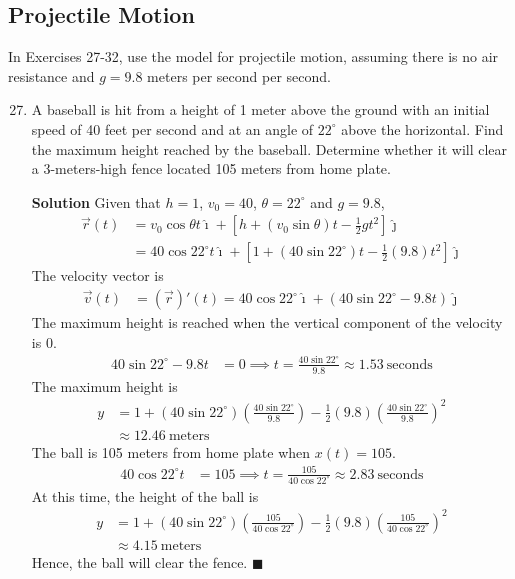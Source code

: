 \documentclass{report}
\begin{document}
\subsection*{Projectile Motion}
In Exercises 27-32, use the model for projectile motion, assuming there is no
air resistance and $g=9.8$ meters per second per second.
\begin{enumerate}
    \setcounter{enumi}{26}
    \item  A baseball is hit from a height of 1 meter above the ground with an initial
          speed of 40 feet per second and at an angle of $22^{\circ}$ above the
          horizontal. Find the maximum height reached by the baseball. Determine whether
          it will clear a 3-meters-high fence located 105 meters from home plate.

          \textbf{Solution} Given that $h = 1$, $v_0 = 40$, $\theta = 22^{\circ}$ and $g = 9.8$,
          \begin{align*}
              \vec{r}(t) & = v_0\cos\theta t\hat{\imath} + \left[h + (v_0\sin\theta) t - \frac{1}{2}gt^2\right]\hat{\jmath}               \\
                         & = 40\cos{22^{\circ}} t\hat{\imath} + \left[1 + (40\sin{22^{\circ}}) t - \frac{1}{2}(9.8)t^2\right]\hat{\jmath}
          \end{align*}
          The velocity vector is
          \begin{align*}
              \vec{v}(t) & = (\vec{r})'(t) = 40\cos{22^{\circ}}\hat{\imath} + (40\sin{22^{\circ}} - 9.8t)\hat{\jmath}
          \end{align*}
          The maximum height is reached when the vertical component of the velocity is $0$.
          \begin{align*}
              40\sin{22^{\circ}} - 9.8t & = 0 \implies t = \frac{40\sin{22^{\circ}}}{9.8} \approx 1.53\ \text{seconds}
          \end{align*}
          The maximum height is
          \begin{align*}
              y & = 1 + (40\sin{22^{\circ}})\left(\frac{40\sin{22^{\circ}}}{9.8}\right) - \frac{1}{2}(9.8)\left(\frac{40\sin{22^{\circ}}}{9.8}\right)^2 \\
                & \approx 12.46\ \text{meters}
          \end{align*}
          The ball is 105 meters from home plate when $x(t) = 105$.
          \begin{align*}
              40\cos{22^{\circ}} t & = 105 \implies t = \frac{105}{40\cos{22^{\circ}}}  \approx 2.83\ \text{seconds}
          \end{align*}
          At this time, the height of the ball is
          \begin{align*}
              y & = 1 + (40\sin{22^{\circ}})\left(\frac{105}{40\cos{22^{\circ}}}\right) - \frac{1}{2}(9.8)\left(\frac{105}{40\cos{22^{\circ}}}\right)^2 \\
                & \approx 4.15\ \text{meters}
          \end{align*}
          Hence, the ball will clear the fence. \hfill$\blacksquare$


\end{enumerate}
\end{document}
